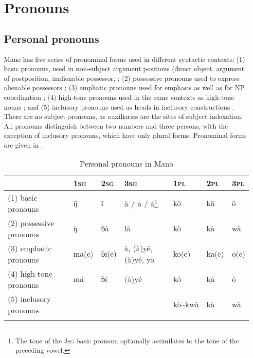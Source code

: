 \documentclass[output=paper]{langscibook}
\begin{document}
 \section{Pronouns}\label{sec:Kachaturyan:3}

 \subsection{Personal pronouns}\label{sec:Kachaturyan:3.1}

Mano has five series of pronominal forms used in different syntactic contexts: (1) basic pronouns, used in non-subject argument positions (direct object, argument of postposition, inalienable possessor, ; (2) possessive pronouns used to express alienable possessors ; (3) emphatic pronouns used for emphasis as well as for NP coordination ; (4) high-tone pronouns used in the same contexts as high-tone nouns ; and (5) inclusory pronouns used as heads in inclusory constructions . There are no subject pronouns, as auxiliaries are the sites of subject indexation. All pronouns distinguish between two numbers and three persons, with the exception of inclusory pronouns, which have only plural forms. Pronominal forms are given in .

\begin{table}
\begin{tabularx}{\textwidth}{p{3.1cm}p{0.8cm}p{0.8cm}p{2cm}p{1.2cm}p{0.8cm}p{0.8cm}} 
\lsptoprule
&\textsc{1sg} & \textsc{2sg} & \textsc{3sg} & \textsc{1pl} & \textsc{2pl} & \textsc{3pl}\\
\midrule
(1) basic pronouns & {\={ŋ}} & {ī} & {à} {/} {ā} {/} {á}\footnote{The tone of the \textsc{3sg} basic pronoun optionally assimilates to the tone of the preceding vowel.} & {kō} & {kā} & {ō}\\
(2) possessive pronouns & {\`{ŋ}} & {ɓà} & {là} & {kò} & {kà} & {wà}\\
(3) emphatic pronouns & {mā(ē)} & {ɓī(ē)} & à, (à)yē, (à)yé, yō & {kō(ē)} & {kā(ē)} & {ō(ē)}\\
(4) high-tone pronouns & {má} & {ɓí} & {(à)yé} & {kó} & {ká} & {ó}\\
(5) inclusory pronouns &  &  &  & {kò{\textasciitilde}kwà} & {kà} & {wà}\\
\lspbottomrule
\end{tabularx}
\caption{Personal pronouns in Mano}
\label{tab:Kachaturyan:1}
\end{table}
\end{document}
